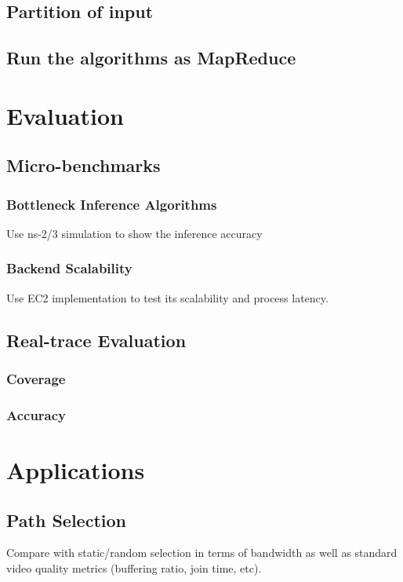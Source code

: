 \documentclass[10pt,twocolumn]{article}
\begin{document}
\subsection{Partition of input}

\subsection{Run the algorithms as MapReduce}

\section{Evaluation}

\subsection{Micro-benchmarks}
\subsubsection{Bottleneck Inference Algorithms}
Use ns-2/3 simulation to show the inference accuracy

\subsubsection{Backend Scalability}
Use EC2 implementation to test its scalability and process latency.


\subsection{Real-trace Evaluation}
\subsubsection{Coverage}


\subsubsection{Accuracy}


\section{Applications}


\subsection{Path Selection}
Compare with static/random selection in terms of bandwidth as well as standard video quality metrics (buffering ratio, join time, etc).
\end{document}
